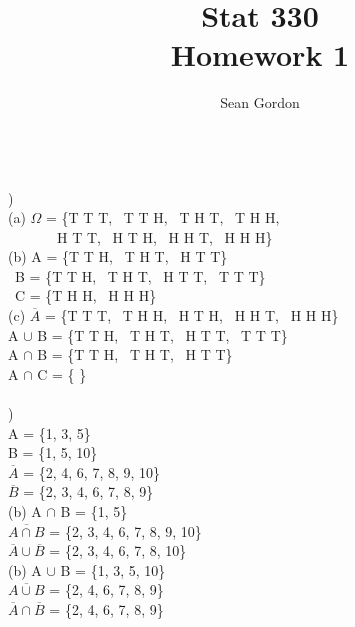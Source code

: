 \documentclass[12pt]{article}
\title{Stat 330\\Homework 1}
\author{Sean Gordon}
\begin{document}
\maketitle


\hrulefill \\


)\\
\indent (a) $\Omega$ = \{T T T, \ T T H, \ T H T, \ T H H,\\ \ \ \
\indent \indent \indent \ \ \ \ H T T, \ H T H, \ H H T, \ H H H\}\\

(b) A = \{T T H, \ T H T, \ H T T\}\\
\indent \indent \ B = \{T T H, \ T H T, \ H T T, \ T T T\}\\
\indent \indent \ C = \{T H H, \ H H H\}\\

(c) $\overline{A}$ = \{T T T, \ T H H, \ H T H, \ H H T, \ H H H\}\\
\indent \indent A $\cup$ B = \{T T H, \ T H T, \ H T T, \ T T T\}\\
\indent \indent A $\cap$ B = \{T T H, \ T H T, \ H T T\}\\
\indent \indent A $\cap$ C = \{ \}\\


\hrulefill \\


)\\
\indent \indent A = \{1, 3, 5\}\\
\indent \indent B = \{1, 5, 10\}\\
\indent \indent $\overline{A}$ = \{2, 4, 6, 7, 8, 9, 10\}\\
\indent \indent $\overline{B}$ = \{2, 3, 4, 6, 7, 8, 9\}\\

(b) A $\cap$ B = \{1, 5\}\\
\indent \indent $\overline{A \cap B}$ = \{2, 3, 4, 6, 7, 8, 9, 10\}\\
\indent \indent $\overline{A} \cup \overline{B}$ = \{2, 3, 4, 6, 7, 8, 10\}\\

(b) A $\cup$ B = \{1, 3, 5, 10\}\\
\indent \indent $\overline{A \cup B}$ = \{2, 4, 6, 7, 8, 9\}\\
\indent \indent $\overline{A} \cap \overline{B}$ = \{2, 4, 6, 7, 8, 9\}\\


\hrulefill \\
\pagebreak
\end{document}
